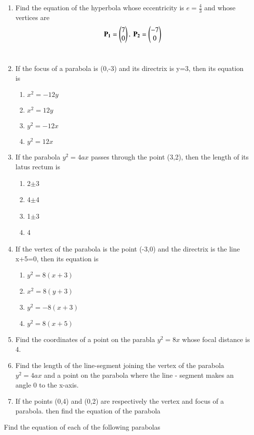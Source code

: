 \begin{enumerate}[label=\thesubsection.\arabic*,ref=\thesubsection.\theenumi,resume*]
    \item Find the equation of the hyperbola whose eccentricity is $e = \frac{4}{3}$
    and whose vertices are
    \begin{align}
        \mathbf{P_1} = \begin{pmatrix}7\\0\end{pmatrix},\ \mathbf{P_2} = \begin{pmatrix}-7\\0\end{pmatrix}
        \label{eq:chapters/11/11/4/14/vert}
    \end{align}
\\
\solution
\item If the focus of a parabola is (0,-3) and its directrix is y=3, then its equation is
\begin{enumerate}
\item $x^2=-12y$
\item $x^2=12y$
\item $y^2=-12x$
\item $y^2=12x$
\end{enumerate}
\item If the parabola $y^2=4ax$ passes through the point (3,2), then the length of its latus rectum is
\begin{enumerate}
\item 2$\pm$3
\item 4$\pm$4
\item 1$\pm$3
\item 4
\end{enumerate}
\item If the vertex of the parabola is the point (-3,0) and the directrix is the line x+5=0, then its equation is
\begin{enumerate}
\item $y^2=8(x+3)$
\item $x^2=8(y+3)$
\item $y^2=-8(x+3)$
\item $y^2=8(x+5)$
\end{enumerate}
 \item Find the coordinates of a point on the parabla $y^2=8x$ whose focal distance is 4.
 \item Find the length of the line-segment joining the vertex of the parabola $y^2=4ax$ and a point on the parabola where the line - segment makes an angle 0 to the x-axis.
\item If the points (0,4) and (0,2) are respectively the vertex and focus of a parabola. then find the equation of the parabola
\end{enumerate}
Find the equation of each of the following parabolas
